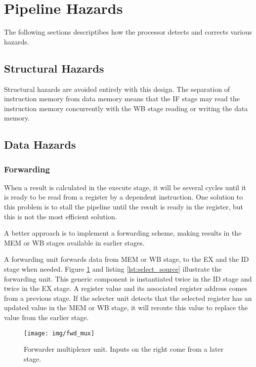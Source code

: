 \section{Pipeline Hazards}
The following sections descriptibes how the processor detects and corrects various hazards.

\subsection{Structural Hazards}
Structural hazards are avoided entirely with this design.
The separation of instruction memory from data memory means that the IF stage may read the instruction memory concurrently with the WB stage reading or writing the data memory.

\subsection{Data Hazards}
\label{sec:data-hazards}
\subsubsection{Forwarding}
When a result is calculated in the execute stage,
it will be several cycles until it is ready to be read from a register by a dependent instruction.
One solution to this problem is to stall the pipeline until the result is ready in the register,
but this is not the most efficient solution.

A better approach is to implement a forwarding scheme,
making results in the MEM or WB stages available in earlier stages.

A forwarding unit forwards data from MEM or WB stage, to the EX and the ID stage when needed.
Figure \ref{fig:fwd_mux} and listing \ref{lst:select_source} illustrate the forwarding unit.
This generic component is instantiated twice in the ID stage and twice in the EX stage.
A register value and its associated register address comes from a previous stage.
If the selecter unit detects that the selected register has an updated value in the MEM or WB stage,
it will reroute this value to replace the value from the earlier stage.

\begin{figure}[h]
    \centering
    \texttt{[image: img/fwd\_mux]}
    \caption{Forwarder multiplexer unit. Inputs on the right come from a later stage.}
    \label{fig:fwd_mux}
\end{figure}


